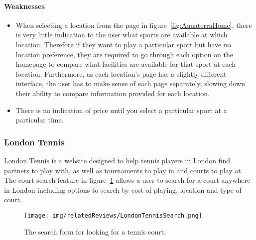 \paragraph{Weaknesses}
\begin{itemize}
	\item When selecting a location from the page in
		figure~\ref{fig:AquaterraHome}, there is very little indication to the
		user what sports are available at which location. Therefore if they
		want to play a particular sport but have no location preference, they
		are required to go through each option on the homepage to compare what
		facilities are available for that sport at each location. Furthermore,
		as each location's page has a slightly different interface, the user
		has to make sense of each page separately, slowing down their ability
		to compare information provided for each location.
	\item There is no indication of price until you select a particular sport
		at a particular time.
\end{itemize}

\subsubsection{London Tennis}
\label{ssub:london_tennis}

London Tennis is a website designed to help tennis players in London find
partners to play with, as well as tournaments to play in and courts to play at.
The court search feature in figure~\ref{fig:LondonTennisSearch} allows a user
to search for a court anywhere in London including options to search by cost of
playing, location and type of court.
\begin{figure}[ht]
	\centering
	\texttt{[image: img/relatedReviews/LondonTennisSearch.png]}
	\caption{The search form for looking for a tennis court.}\label{fig:LondonTennisSearch}
\end{figure}


